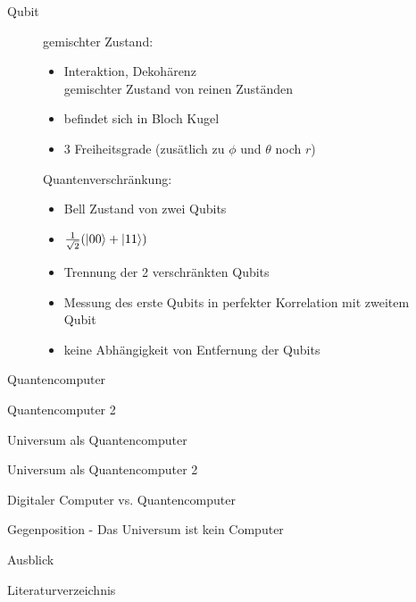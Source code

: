 \documentclass[aspectratio=1610, 9pt]{beamer}
\begin{document}
\begin{frame}{Qubit}
  \begin{figure}
    \begin{minipage}{0.49\textwidth}
      gemischter Zustand:
      \begin{itemize}
        \item Interaktion, Dekohärenz \rightarrow \\
        gemischter Zustand von reinen Zuständen
        \item befindet sich in Bloch Kugel
        \item 3 Freiheitsgrade (zusätlich zu $\phi$ und $\theta$ noch $r$)
      \end{itemize}
    \end{minipage}
    \hfill
    \begin{minipage}{0.49\textwidth}
      Quantenverschränkung:
      \begin{itemize}
        \item Bell Zustand von zwei Qubits
        \item[] $\frac{1}{\sqrt{2}}(\ket{00} + \ket{11})$
        \item Trennung der 2 verschränkten Qubits
        \item Messung des erste Qubits in perfekter Korrelation mit zweitem Qubit
        \item keine Abhängigkeit von Entfernung der Qubits
      \end{itemize}

    \end{minipage}
  \end{figure}
\end{frame}

\begin{frame}{Quantencomputer}

\end{frame}

\begin{frame}{Quantencomputer 2}

\end{frame}

\begin{frame}{Universum als Quantencomputer}

\end{frame}

\begin{frame}{Universum als Quantencomputer 2}

\end{frame}

\begin{frame}{Digitaler Computer vs. Quantencomputer}

\end{frame}

\begin{frame}{Gegenposition - Das Universum ist kein Computer}

\end{frame}

\begin{frame}{Ausblick}

\end{frame}

\begin{frame}{Literaturverzeichnis}

\end{frame}
\end{document}
